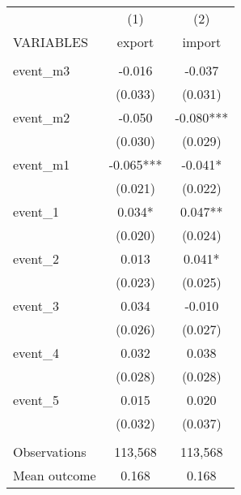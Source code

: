 \begin{tabular}{lcc} \hline
 & (1) & (2) \\
VARIABLES & export & import \\ \hline
 &  &  \\
event\_m3 & -0.016 & -0.037 \\
 & (0.033) & (0.031) \\
event\_m2 & -0.050 & -0.080*** \\
 & (0.030) & (0.029) \\
event\_m1 & -0.065*** & -0.041* \\
 & (0.021) & (0.022) \\
event\_1 & 0.034* & 0.047** \\
 & (0.020) & (0.024) \\
event\_2 & 0.013 & 0.041* \\
 & (0.023) & (0.025) \\
event\_3 & 0.034 & -0.010 \\
 & (0.026) & (0.027) \\
event\_4 & 0.032 & 0.038 \\
 & (0.028) & (0.028) \\
event\_5 & 0.015 & 0.020 \\
 & (0.032) & (0.037) \\
 &  &  \\
Observations & 113,568 & 113,568 \\
 Mean outcome & 0.168 & 0.168 \\ \hline
\end{tabular}

